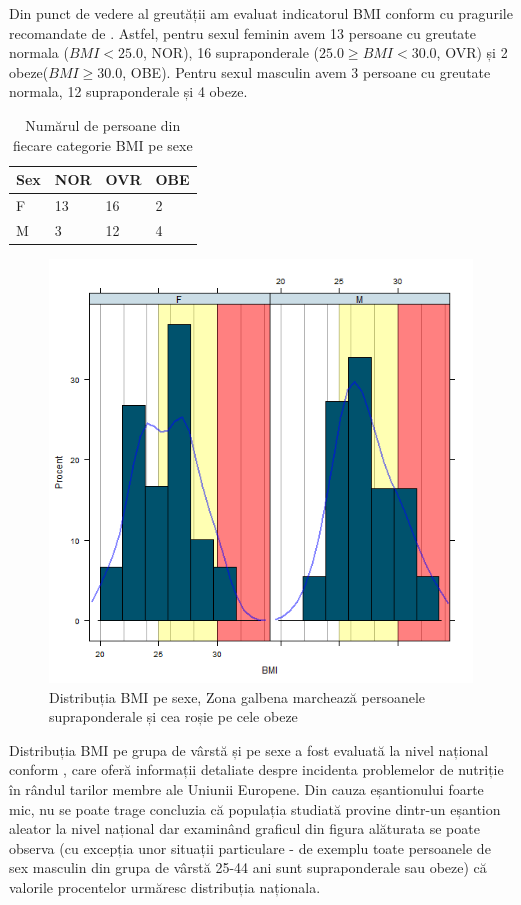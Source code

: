 \documentclass[11pt,draft]{article}
\begin{document}
  Din punct de vedere al greutății am evaluat indicatorul \ac{BMI} conform cu pragurile recomandate de \citep{whobmi06}. 
  Astfel, pentru sexul feminin avem 13 persoane cu greutate normala ($BMI<25.0$, NOR), 16 supraponderale ($25.0 \geq BMI <30.0$, OVR) și 2 obeze($BMI \geq 30.0$, OBE). 
  Pentru sexul masculin avem 3 persoane cu greutate normala, 12 supraponderale și 4 obeze.   
  \begin{table}[H]
   \centering
   \begin{tabular}{ |l|l|l|l| }
    \hline
    Sex & NOR & OVR & OBE \\ \hline
    F & 13 & 16 & 2 \\ \hline
    M & 3 &  12 & 4 \\ \hline
   \end{tabular}
   \caption{Numărul de persoane din fiecare categorie \ac{BMI} pe sexe}
   \label{tab:BMIgSex}
  \end{table}
  \begin{figure}[H]
    \centering
    \includegraphics[width=0.8\linewidth]{incobmiDens}
    \caption{Distribuția \ac{BMI} pe sexe, Zona galbena marchează persoanele supraponderale și cea roșie pe cele obeze}
    \label{fig:incobmiDens}
  \end{figure}
  Distribuția \ac{BMI} pe grupa de vârstă și pe sexe a fost evaluată la nivel național conform \citep{EHIS09}, care oferă informații detaliate despre incidenta problemelor de nutriție în rândul tarilor membre ale Uniunii Europene. 
  Din cauza eșantionului foarte mic, nu se poate trage concluzia că populația studiată provine dintr-un eșantion aleator la nivel național dar examinând graficul din figura alăturata se poate observa (cu excepția unor situații particulare - de exemplu toate persoanele de sex masculin din grupa de vârstă 25-44 ani sunt supraponderale sau obeze) că valorile procentelor urmăresc distribuția naționala. 
\end{document}
